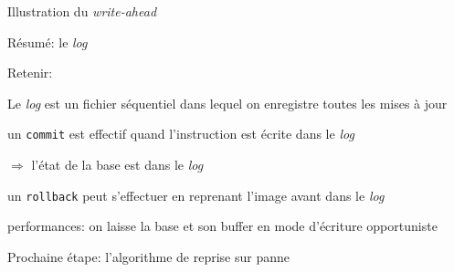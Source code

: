 \documentclass[aspectratio=169, handout]{beamer} %
\begin{document}
\begin{frame}{Illustration du \textit{write-ahead}}


\end{frame}

\begin{frame}{Résumé: le \textit{log}}

Retenir:

\vfill

\begin{redbullet}

  \item Le \textit{log} est un fichier séquentiel dans lequel
     on enregistre toutes les mises à jour
     
   \item un \texttt{commit} est effectif quand l'instruction est écrite dans le \textit{log}

        $\Rightarrow$ l'état de la base est dans le \textit{log}

   \item un \texttt{rollback} peut s'effectuer en reprenant l'image avant dans le \textit{log}
   
  \item performances: on laisse la base et son buffer en mode d'écriture opportuniste   

\end{redbullet}

\vfill

\begin{blocgauche}
Prochaine étape: l'algorithme de reprise sur panne
\end{blocgauche}

\end{frame}
\end{document}

